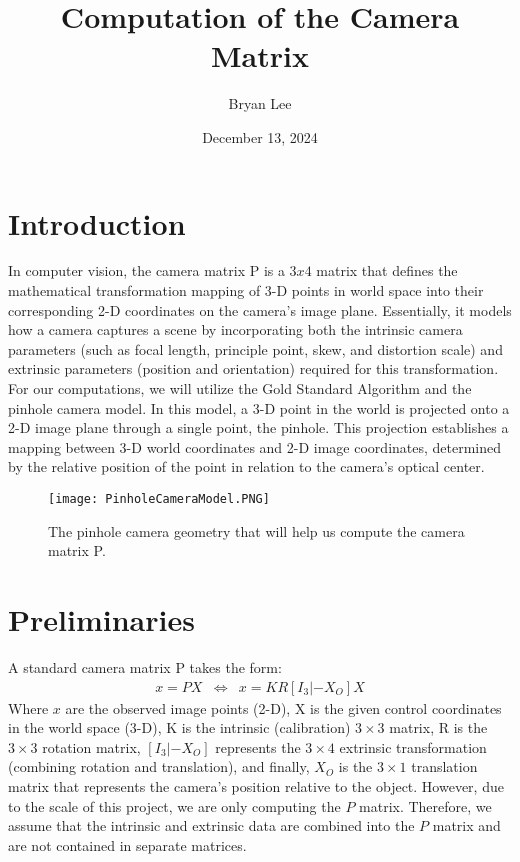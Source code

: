 \documentclass[12pt]{article}
\title{Computation of the Camera Matrix}
\author{Bryan Lee}
\date{December 13, 2024}
\begin{document}
\maketitle

\section{Introduction}
In computer vision, the camera matrix P is a \( 3x 4\) matrix that defines the mathematical transformation mapping of 3-D points in world space into their corresponding 2-D coordinates on the camera's image plane. Essentially, it models how a camera captures a scene by incorporating both the intrinsic camera parameters (such as focal length, principle point, skew, and distortion scale) and extrinsic parameters (position and orientation) required for this transformation. For our computations, we will utilize the Gold Standard Algorithm and the pinhole camera model. In this model, a 3-D point in the world is projected onto a 2-D image plane through a single point, the pinhole. This projection establishes a mapping between 3-D world coordinates and 2-D image coordinates, determined by the relative position of the point in relation to the camera's optical center.

\begin{figure}[ht]
    \centering
    \texttt{[image: PinholeCameraModel.PNG]}
    \caption{The pinhole camera geometry that will help us compute the camera matrix P.}
\end{figure}

\section{Preliminaries}
A standard camera matrix P takes the form:
\[
	\begin{array}{rrcl}
        x = PX & \Leftrightarrow & x = KR[I_3 | -X_O]X
	\end{array}
\]
Where \( x \) are the observed image points (2-D), X is the given control coordinates in the world space (3-D), K is the intrinsic (calibration) \( 3 \times 3 \) matrix, R is the \( 3 \times 3 \) rotation matrix, \( [I_3 | -X_O] \) represents the \( 3 \times 4 \) extrinsic transformation (combining rotation and translation), and finally, \( X_O \) is the \( 3 \times 1 \) translation matrix that represents the camera's position relative to the object. \noindent However, due to the scale of this project, we are only computing the \( P \) matrix. Therefore, we assume that the intrinsic and extrinsic data are combined into the \( P \) matrix and are not contained in separate matrices. \\
\end{document}

